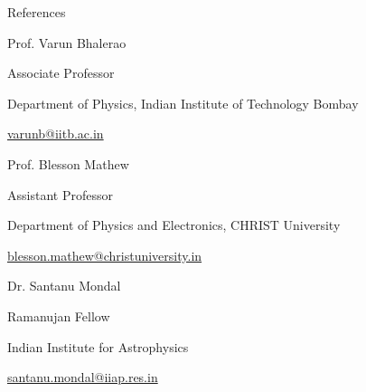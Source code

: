 \begin{rSection}{References}
\hspace{-1.2em}\begin{rSubsection}{Prof. Varun Bhalerao}{}{}{}
\vspace{-0.5em}
\item [] Associate Professor
\item []Department of Physics, Indian Institute of Technology Bombay
\item [] \href{mailto:varunb@iitb.ac.in}{varunb@iitb.ac.in}
\end{rSubsection}

\vspace{-0.5em}

\hspace{-1.2em}\begin{rSubsection}{Prof. Blesson Mathew}{}{}{}
\vspace{-0.5em}
\item [] Assistant Professor
\item [] Department of Physics and Electronics, CHRIST University
\item [] \href{mailto:blesson.mathew@christuniversity.in}{blesson.mathew@christuniversity.in}
\end{rSubsection}

\vspace{-0.5em}

\hspace{-1.2em}\begin{rSubsection}{Dr. Santanu Mondal}{}{}{}
\vspace{-0.5em}
\item [] Ramanujan Fellow
\item [] Indian Institute for Astrophysics
\item [] \href{mailto:santanu.mondal@iiap.res.in}{santanu.mondal@iiap.res.in}
\end{rSubsection}
\end{rSection}